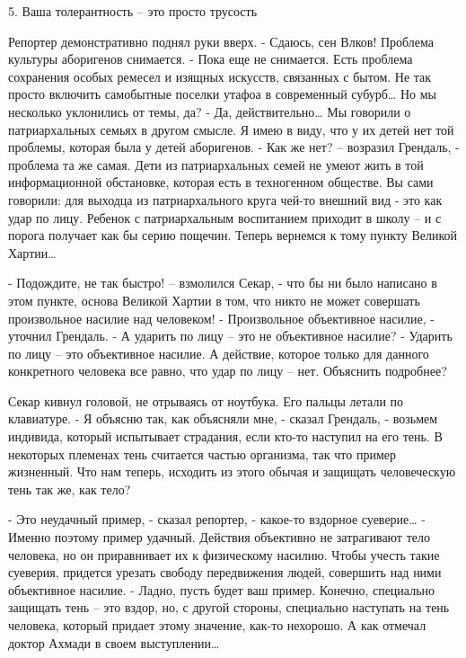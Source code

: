 \documentclass{book}
\begin{document}
5. Ваша толерантность – это просто трусость


Репортер демонстративно поднял руки вверх.
- Сдаюсь, сен Влков! Проблема культуры аборигенов снимается.
- Пока еще не снимается. Есть проблема сохранения особых ремесел и изящных искусств, связанных с бытом. Не так просто включить самобытные поселки утафоа в современный субурб\ldots{} Но мы несколько уклонились от темы, да?
- Да, действительно\ldots{} Мы говорили о патриархальных семьях в другом смысле. Я имею в виду, что у их детей нет той проблемы, которая была у детей аборигенов.
- Как же нет? – возразил Грендаль, - проблема та же самая. Дети из патриархальных семей не умеют жить в той информационной обстановке, которая есть в техногенном обществе. Вы сами говорили: для выходца из патриархального круга чей-то внешний вид - это как удар по лицу. Ребенок с патриархальным воспитанием приходит в школу – и с порога получает как бы серию пощечин. Теперь вернемся к тому пункту Великой Хартии\ldots{}

- Подождите, не так быстро! – взмолился Секар, - что бы ни было написано в этом пункте, основа Великой Хартии в том, что никто не может совершать произвольное насилие над человеком!
- Произвольное объективное насилие, - уточнил Грендаль.
- А ударить по лицу – это не объективное насилие?
- Ударить по лицу – это объективное насилие. А действие, которое только для данного конкретного человека все равно, что удар по лицу – нет. Объяснить подробнее?

Секар кивнул головой, не отрываясь от ноутбука. Его пальцы летали по клавиатуре.
- Я объясню так, как объясняли мне, - сказал Грендаль, - возьмем индивида, который испытывает страдания, если кто-то наступил на его тень. В некоторых племенах тень считается частью организма, так что пример жизненный. Что нам теперь, исходить из этого обычая и защищать человеческую тень так же, как тело?

- Это неудачный пример, - сказал репортер, - какое-то вздорное суеверие\ldots{}
- Именно поэтому пример удачный. Действия объективно не затрагивают тело человека, но он приравнивает их к физическому насилию. Чтобы учесть такие суеверия, придется урезать свободу передвижения людей, совершить над ними объективное насилие.
- Ладно, пусть будет ваш пример. Конечно, специально защищать тень – это вздор, но, с другой стороны, специально наступать на тень человека, который придает этому значение, как-то нехорошо. А как отмечал доктор Ахмади в своем выступлении\ldots{}
\end{document}
